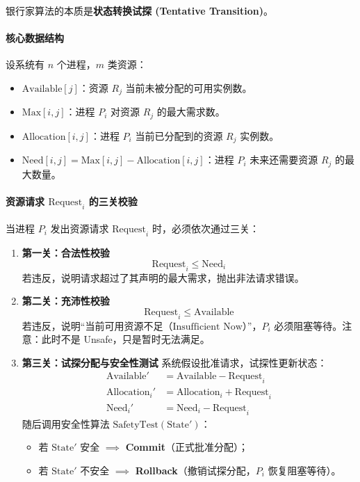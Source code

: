 \documentclass[11pt,a4paper]{ctexart}
\newcommand{\kw}[1]{\textbf{#1}}
\begin{document}
银行家算法的本质是\kw{状态转换试探 (Tentative Transition)}。

\paragraph{核心数据结构}
设系统有 $n$ 个进程，$m$ 类资源：
\begin{itemize}
\item $\text{Available}[j]$：资源 $R_j$ 当前未被分配的可用实例数。
\item $\text{Max}[i, j]$：进程 $P_i$ 对资源 $R_j$ 的最大需求数。
\item $\text{Allocation}[i, j]$：进程 $P_i$ 当前已分配到的资源 $R_j$ 实例数。
\item $\text{Need}[i, j] = \text{Max}[i, j] - \text{Allocation}[i, j]$：进程 $P_i$ 未来还需要资源 $R_j$ 的最大数量。
\end{itemize}

\paragraph{资源请求 $\text{Request}_i$ 的三关校验}
当进程 $P_i$ 发出资源请求 $\text{Request}_i$ 时，必须依次通过三关：

\begin{enumerate}
\item \kw{第一关：合法性校验}
\[
\text{Request}_i \le \text{Need}_i
\]
若违反，说明请求超过了其声明的最大需求，抛出非法请求错误。

\item \kw{第二关：充沛性校验}
\[
\text{Request}_i \le \text{Available}
\]
若违反，说明“当前可用资源不足（$\boxed{\text{Insufficient Now}}$）”，$P_i$ 必须阻塞等待。注意：此时不是 Unsafe，只是暂时无法满足。

\item \kw{第三关：试探分配与安全性测试}
系统假设批准请求，试探性更新状态：
\[
\begin{aligned}
\text{Available}' &= \text{Available} - \text{Request}_i \\
\text{Allocation}_i' &= \text{Allocation}_i + \text{Request}_i \\
\text{Need}_i' &= \text{Need}_i - \text{Request}_i
\end{aligned}
\]
随后调用安全性算法 $\boxed{\text{SafetyTest}(\text{State}')}$：
\begin{itemize}
\item 若 $\text{State}'$ 安全 $\implies$ \kw{Commit}（正式批准分配）；
\item 若 $\text{State}'$ 不安全 $\implies$ \kw{Rollback}（撤销试探分配，$P_i$ 恢复阻塞等待）。
\end{itemize}
\end{enumerate}
\end{document}
